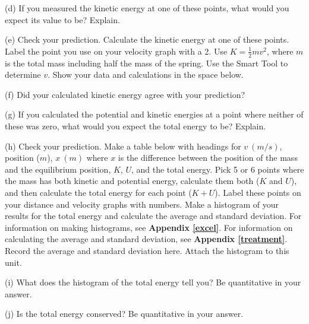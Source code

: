 (d) If you measured the kinetic energy at one of these points, what would you
expect its value to be? Explain.
\vspace{20mm}

\newpage
(e) Check your prediction. Calculate the kinetic energy at one of these points.
Label the point you use on your velocity graph with a 2. Use 
$K = \frac{1}{2} mv^{2}$, where $m$ is the total mass including half the mass of 
the spring. Use the Smart Tool to determine $v$. Show your data and 
calculations in the space below.
\vspace{20mm}

(f) Did your calculated kinetic energy agree with your prediction?
\vspace{15mm}

(g) If you calculated the potential and kinetic energies at a point where 
neither of these was zero, what would you expect the total energy to be? 
Explain.
\vspace{20mm}

(h) Check your prediction. Make a table below with headings for $v~(m/s)$, 
position ($m$), $x~(m)$ where $x$ is the difference between the position
of the mass and the equilibrium position, $K$, $U$, and the total energy.
Pick 5 or 6 points where the mass has both kinetic and
potential energy, calculate them both ($K$ and $U$), and then calculate the 
total energy for each point ($K+U$). Label these points on your distance
and velocity graphs with numbers. 
Make a histogram of your results for the total energy and calculate the 
average and standard deviation.
For information on making histograms, see \textbf{Appendix \ref{excel}}. For information 
on calculating the average and standard deviation, see \textbf{Appendix \ref{treatment}}. 
Record the average and standard deviation here.
Attach the histogram to this unit.
\vspace{60mm}

(i) What does the histogram of the total energy tell you? Be quantitative in 
your answer.
\vspace{20mm}

(j) Is the total energy conserved?  Be quantitative in your answer.

